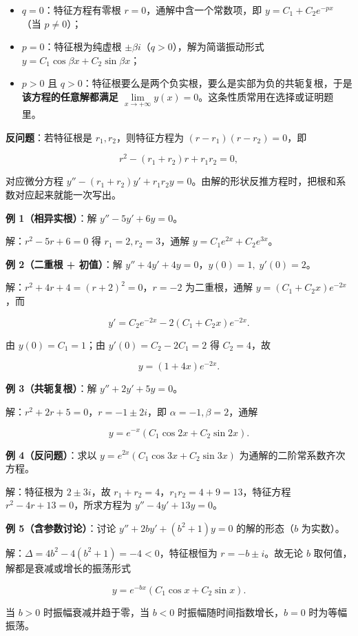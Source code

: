 \documentclass[11pt,openany,UTF8]{ctexbook}
\begin{document}
\begin{itemize}
\item $q=0$：特征方程有零根 $r=0$，通解中含一个常数项，即 $y=C_1+C_2e^{-px}$（当 $p\ne 0$）；
\item $p=0$：特征根为纯虚根 $\pm\beta i$（$q>0$），解为简谐振动形式 $y=C_1\cos\beta x+C_2\sin\beta x$；
\item $p>0$ 且 $q>0$：特征根要么是两个负实根，要么是实部为负的共轭复根，于是\textbf{该方程的任意解都满足 $\lim\limits_{x\to+\infty}y(x)=0$}。这条性质常用在选择或证明题里。
\end{itemize}
\textbf{反问题}：若特征根是 $r_1,r_2$，则特征方程为 $(r-r_1)(r-r_2)=0$，即

\[r^{2}-(r_1+r_2)r+r_1r_2=0,\]

对应微分方程 $y''-(r_1+r_2)y'+r_1r_2y=0$。由解的形状反推方程时，把根和系数对应起来就能一次写出。

\textbf{例 1（相异实根）}：解 $y''-5y'+6y=0$。

解：$r^{2}-5r+6=0$ 得 $r_1=2,r_2=3$，通解 $y=C_1e^{2x}+C_2e^{3x}$。

\textbf{例 2（二重根 + 初值）}：解 $y''+4y'+4y=0$，$y(0)=1,\;y'(0)=2$。

解：$r^{2}+4r+4=(r+2)^{2}=0$，$r=-2$ 为二重根，通解 $y=(C_1+C_2x)e^{-2x}$，而

\[y'=C_2e^{-2x}-2(C_1+C_2x)e^{-2x}.\]

由 $y(0)=C_1=1$；由 $y'(0)=C_2-2C_1=2$ 得 $C_2=4$，故

\[y=(1+4x)e^{-2x}.\]

\textbf{例 3（共轭复根）}：解 $y''+2y'+5y=0$。

解：$r^{2}+2r+5=0$，$r=-1\pm 2i$，即 $\alpha=-1,\beta=2$，通解

\[y=e^{-x}\left(C_1\cos 2x+C_2\sin 2x\right).\]

\textbf{例 4（反问题）}：求以 $y=e^{2x}(C_1\cos 3x+C_2\sin 3x)$ 为通解的二阶常系数齐次方程。

解：特征根为 $2\pm 3i$，故 $r_1+r_2=4$，$r_1r_2=4+9=13$，特征方程 $r^{2}-4r+13=0$，所求方程为 $y''-4y'+13y=0$。

\textbf{例 5（含参数讨论）}：讨论 $y''+2by'+\left(b^{2}+1\right)y=0$ 的解的形态（$b$ 为实数）。

解：$\Delta=4b^{2}-4\left(b^{2}+1\right)=-4<0$，特征根恒为 $r=-b\pm i$。故无论 $b$ 取何值，解都是衰减或增长的振荡形式

\[y=e^{-bx}\left(C_1\cos x+C_2\sin x\right).\]

当 $b>0$ 时振幅衰减并趋于零，当 $b<0$ 时振幅随时间指数增长，$b=0$ 时为等幅振荡。
\end{document}
